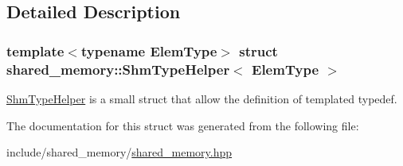 \subsection{Detailed Description}
\subsubsection*{template$<$typename Elem\+Type$>$\newline
struct shared\+\_\+memory\+::\+Shm\+Type\+Helper$<$ Elem\+Type $>$}

\hyperlink{structshared__memory_1_1ShmTypeHelper}{Shm\+Type\+Helper} is a small struct that allow the definition of templated typedef. 

The documentation for this struct was generated from the following file\+:\begin{DoxyCompactItemize}
\item 
include/shared\+\_\+memory/\hyperlink{shared__memory_8hpp}{shared\+\_\+memory.\+hpp}\end{DoxyCompactItemize}
